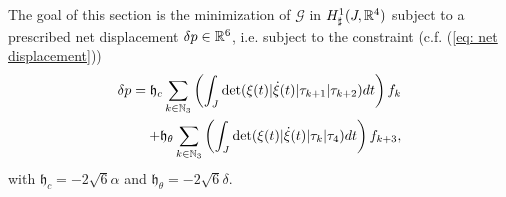 The goal of this section is the minimization of $\mathcal{G}$ in $H_{\sharp}^1(J, \mathbb{R}^4)$ subject to a prescribed net displacement $\delta p \in \mathbb{R}^6$, i.e. subject to the constraint (c.f. (\ref{eq: net displacement}))
\begin{equation}
\label{eq: constraint}
\begin{aligned}
	 \delta p = \mathfrak{h}_{c} \sum_{k \in \mathbb{N}_3}\left ( \int_{J} \det( \xi(t) | \dot{\xi}(t) | \tau_{k+1} | \tau_{k+2}) dt \right ) f_k\\
	+ \mathfrak{h}_{\theta}  \sum_{k \in \mathbb{N}_3}\left ( \int_{J} \det ( \xi(t) | \dot{\xi}(t) | \tau_{k} | \tau_{4}) dt\right ) f_{k + 3},
\end{aligned}
\end{equation}
with $\mathfrak{h}_c = - 2 \sqrt{6} \alpha$ and $\mathfrak{h}_{\theta} = - 2 \sqrt{6} \delta$.


